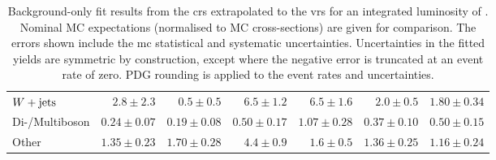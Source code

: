 \begin{table}
\begin{center}
{\begin{tabular}{lrrrrrr}
        $W+\mathrm{jets}$        & $2.8 \pm 2.3$          & $0.5 \pm 0.5$          & $6.5 \pm 1.2$    & $6.5 \pm 1.6$          & $2.0 \pm 0.5$          & $1.80 \pm 0.34$              \\
        Di-/Multiboson       & $0.24 \pm 0.07$          & $0.19 \pm 0.08$          & $0.50 \pm 0.17$     & $1.07 \pm 0.28$          & $0.37 \pm 0.10$          & $0.50 \pm 0.15$              \\
        Other       & $1.35 \pm 0.23$          & $1.70 \pm 0.28$          & $4.4 \pm 0.9$    & $1.6 \pm 0.5$          & $1.36 \pm 0.25$          & $1.16 \pm 0.24$              \\
\bottomrule
\end{tabular}
}
\end{center}
\caption{ Background-only fit results from the \glspl{cr} extrapolated to the \glspl{vr} for an integrated luminosity of \onethirtynineifb. Nominal MC expectations (normalised to MC cross-sections) are given for comparison. The errors shown include the \gls{mc} statistical and systematic uncertainties. Uncertainties in the fitted yields are symmetric by construction, except where the negative error is truncated at an event rate of zero. PDG rounding is applied to the event rates and uncertainties.}
\label{tab:results_bkg_only_VR}
\end{table}
%